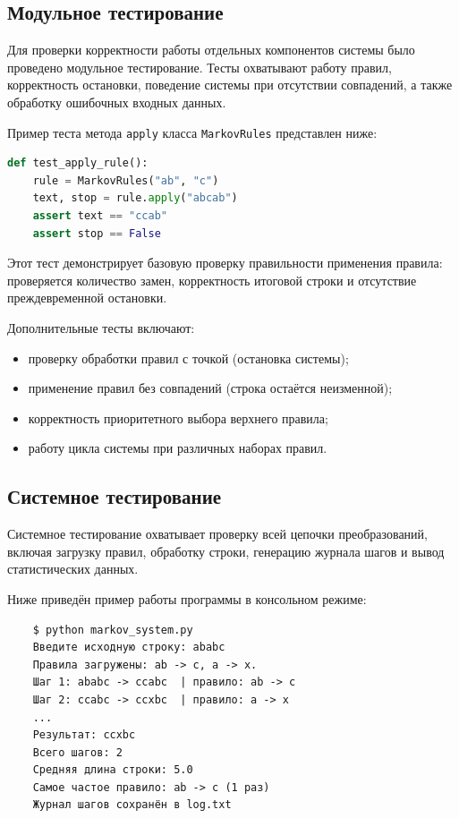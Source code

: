 \subsection{Модульное тестирование}

Для проверки корректности работы отдельных компонентов системы было проведено модульное тестирование. Тесты охватывают работу правил, корректность остановки, поведение системы при отсутствии совпадений, а также обработку ошибочных входных данных.

Пример теста метода \texttt{apply} класса \texttt{MarkovRules} представлен ниже:

\begin{lstlisting}[language=Python]
	def test_apply_rule():
	rule = MarkovRules("ab", "c")
	text, stop = rule.apply("abcab")
	assert text == "ccab"
	assert stop == False
\end{lstlisting}

Этот тест демонстрирует базовую проверку правильности применения правила: проверяется количество замен, корректность итоговой строки и отсутствие преждевременной остановки.

Дополнительные тесты включают:
\begin{itemize}
	\item проверку обработки правил с точкой (остановка системы);
	\item применение правил без совпадений (строка остаётся неизменной);
	\item корректность приоритетного выбора верхнего правила;
	\item работу цикла системы при различных наборах правил.
\end{itemize}

\subsection{Системное тестирование}

Системное тестирование охватывает проверку всей цепочки преобразований, включая загрузку правил, обработку строки, генерацию журнала шагов и вывод статистических данных.

Ниже приведён пример работы программы в консольном режиме:

\begin{verbatim}
	$ python markov_system.py
	Введите исходную строку: ababc
	Правила загружены: ab -> c, a -> x.
	Шаг 1: ababc -> ccabc  | правило: ab -> c
	Шаг 2: ccabc -> ccxbc  | правило: a -> x
	...
	Результат: ccxbc
	Всего шагов: 2
	Средняя длина строки: 5.0
	Самое частое правило: ab -> c (1 раз)
	Журнал шагов сохранён в log.txt
\end{verbatim}

